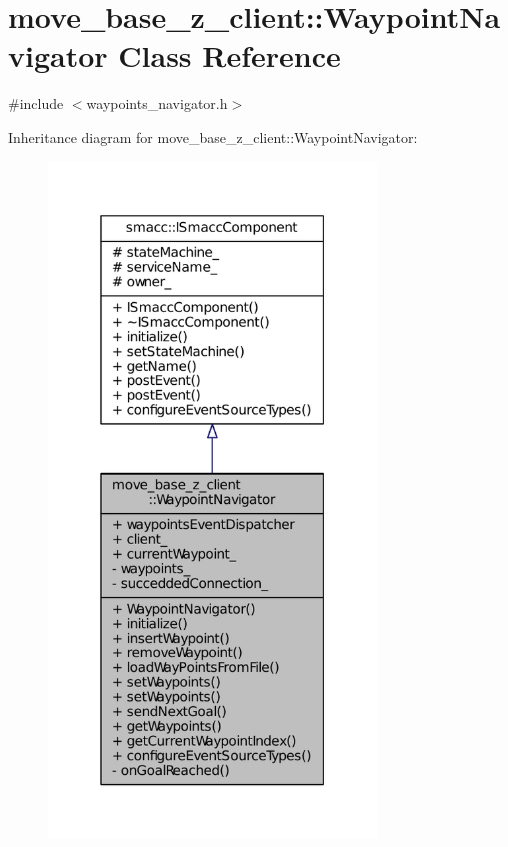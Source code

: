 \hypertarget{classmove__base__z__client_1_1WaypointNavigator}{}\section{move\+\_\+base\+\_\+z\+\_\+client\+:\+:Waypoint\+Navigator Class Reference}
\label{classmove__base__z__client_1_1WaypointNavigator}


{\ttfamily \#include $<$waypoints\+\_\+navigator.\+h$>$}



Inheritance diagram for move\+\_\+base\+\_\+z\+\_\+client\+:\+:Waypoint\+Navigator\+:
\nopagebreak
\begin{figure}[H]
\begin{center}
\leavevmode
\includegraphics[width=247pt]{classmove__base__z__client_1_1WaypointNavigator__inherit__graph}
\end{center}
\end{figure}


